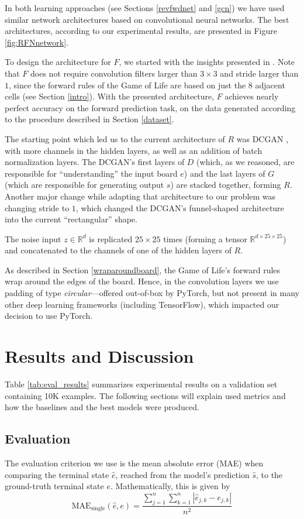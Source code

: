 \documentclass[conference]{IEEEtran}
\begin{document}
In both learning approaches (see Sections \ref{revfwdnet} and \ref{gcn}) we have used similar network architectures based on convolutional neural networks. The best architectures, according to our experimental results, are presented in Figure \ref{fig:RFNnetwork}.

To design the architecture for $F$, we started with the insights presented in \cite{springer2020its}. Note that $F$ does not require convolution filters larger than $3 \times 3$ and stride larger than $1$, since the forward rules of the Game of Life are based on just the 8 adjacent cells (see Section \ref{intro}). With the presented architecture, $F$ achieves nearly perfect accuracy on the forward prediction task, on the data generated according to the procedure described in Section \ref{dataset}.

The starting point which led us to the current architecture of $R$ was DCGAN \cite{radford2016unsupervised}, with more channels in the hidden layers, as well as an addition of batch normalization layers. The DCGAN's first layers of $D$ (which, as we reasoned, are responsible for ``understanding'' the input board $e$) and the last layers of $G$ (which are responsible for generating output $s$) are stacked together, forming $R$. Another major change while adapting that architecture to our problem was changing stride to $1$, which changed the DCGAN's funnel-shaped architecture into the current ``rectangular'' shape. 

The noise input $z \in \mathbb{R}^d$ is replicated $25 \times 25$ times (forming a tensor $\mathbb{R}^{d\times25\times25}$) and concatenated to the channels of one of the hidden layers of $R$.

As described in Section \ref{wraparoundboard}, the Game of Life's forward rules wrap around the edges of the board. Hence, in the convolution layers we use padding of type {\it circular}---offered out-of-box by PyTorch, but not present in many other deep learning frameworks (including TensorFlow), which impacted our decision to use PyTorch.


\section{Results and Discussion}
\label{results}
Table \ref{tab:eval_results} summarizes experimental results on a validation set containing 10K examples. The following sections will explain used metrics and how the baselines and the best models were produced.

\subsection{Evaluation}
\label{evaluation}
The evaluation criterion we use is the mean absolute error (MAE) when comparing the terminal state $\hat{e}$, reached from the model's prediction $\hat{s}$, to the ground-truth terminal state $e$. Mathematically, this is given by
$$\mathrm{MAE}_{\text{single}}(\hat e, e) = \frac{ \sum_{j=1}^{n}\sum_{k=1}^{n}|\hat e_{j,k} - e_{j,k}|}{n^2}$$
\end{document}
